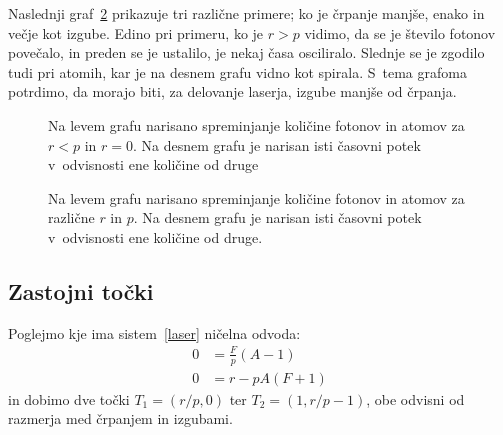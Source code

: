 \documentclass[a4paper,pdftex,10pt]{article}
\numberwithin{equation}{section} %
\numberwithin{figure}{section} %
\numberwithin{table}{section} %
\begin{document}
Naslednji graf~\ref{slika9} prikazuje tri različne primere; ko je črpanje manjše, enako
in večje kot izgube. Edino pri primeru, ko je $r>p$ vidimo, da se je število fotonov 
povečalo, in preden se je ustalilo, je nekaj časa osciliralo. Slednje se je zgodilo tudi
pri atomih, kar je na desnem grafu vidno kot spirala. S~tema grafoma potrdimo, da morajo 
biti, za delovanje laserja, izgube manjše od črpanja.
\begin{figure}    
    \centering
    \resizebox{.48\linewidth}{!}{}
    \resizebox{0.48\linewidth}{!}{}
    \caption{Na levem grafu narisano spreminjanje količine fotonov in atomov za $r<p$ in 
    $r=0$. Na desnem grafu je narisan isti časovni potek v~odvisnosti ene količine od druge}
    \label{slika8}
\end{figure}

\begin{figure}    
    \centering
    \resizebox{.49\linewidth}{!}{}
    \resizebox{.49\linewidth}{!}{}
    \caption{Na levem grafu narisano spreminjanje količine fotonov in atomov za različne
    $r$ in $p$. Na desnem grafu je narisan isti časovni potek v~odvisnosti ene količine od 
    druge.}
    \label{slika9}
\end{figure}

\subsection{Zastojni točki}
Poglejmo kje ima sistem~\ref{laser} ničelna odvoda:
\begin{align*}
    0 &= \frac{F}{p} \left(A - 1\right) \\
    0 &= r - pA\left(F + 1\right)
\end{align*}
in dobimo dve točki $T_1 = (r / p, 0) $ ter $T_2 = (1, r/p - 1)$, obe odvisni od razmerja
med črpanjem in izgubami.
\end{document}
